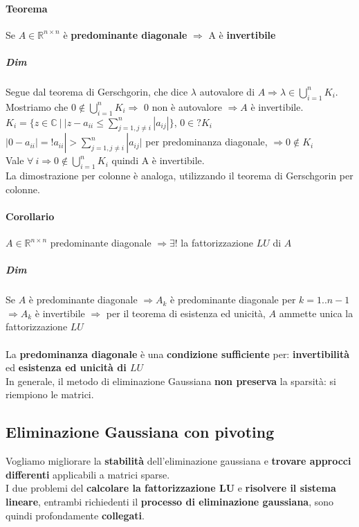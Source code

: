 \documentclass[10pt]{book}
\begin{document}
\paragraph{Teorema} Se $A \in \mathbb{R}^{n \times n}$ è \textbf{predominante diagonale} $\Rightarrow$ A è \textbf{invertibile}
\subparagraph{Dim} Segue dal teorema di Gerschgorin, che dice $\lambda$ autovalore di $A \Rightarrow \lambda \in \bigcup_{i=1}^n K_i$.\\
Mostriamo che $0 \not\in \bigcup_{i=1}^n K_i \Rightarrow$ 0 non è autovalore $\Rightarrow A$ è invertibile.\\
$K_i = \{ z \in \mathbb{C}\: |\: |z - a_{ii} \leq \sum_{j=1, j\neq i}^n |a_{ij}|\}$, $0 \in? K_i$\\
$|0 - a_{ii}| = !a_{ii}| > \sum_{j=1, j\neq i}^n |a_{ij}|$ per predominanza diagonale, $\Rightarrow 0 \not\in K_i$\\
Vale $\forall\: i \Rightarrow 0 \not\in \bigcup_{i=1}^n K_i$ quindi A è invertibile.\\
La dimostrazione per colonne è analoga, utilizzando il teorema di Gerschgorin per colonne.
\paragraph{Corollario} $A \in \mathbb{R}^{n \times n}$ predominante diagonale $\Rightarrow \exists!$ la fattorizzazione $LU$ di $A$
\subparagraph{Dim} Se $A$ è predominante diagonale $\Rightarrow A_k$ è predominante diagonale per $k = 1 .. n-1$\\
$\Rightarrow A_k$ è invertibile $\Rightarrow$ per il teorema di esistenza ed unicità, $A$ ammette unica la fattorizzazione $LU$
\paragraph{} La \textbf{predominanza diagonale} è una \textbf{condizione sufficiente} per: \textbf{invertibilità} ed \textbf{esistenza ed unicità di $LU$}\\
In generale, il metodo di eliminazione Gaussiana \textbf{non preserva} la sparsità: si riempiono le matrici.
\subsection{Eliminazione Gaussiana con pivoting}
Vogliamo migliorare la \textbf{stabilità} dell'eliminazione gaussiana e \textbf{trovare approcci differenti} applicabili a matrici sparse.\\
I due problemi del \textbf{calcolare la fattorizzazione LU} e \textbf{risolvere il sistema lineare}, entrambi richiedenti il \textbf{processo di eliminazione gaussiana}, sono quindi profondamente \textbf{collegati}.
\end{document}
